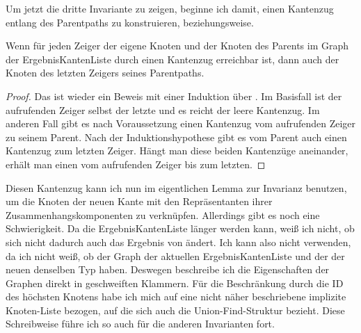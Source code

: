 


Um jetzt die dritte Invariante zu zeigen, beginne ich damit, einen Kantenzug entlang des Parentpaths zu konstruieren, beziehungsweise.

\begin{lemma}[\Kruskalparentwalk]\label{Kruskalparentwalk}
  Wenn für jeden Zeiger der eigene Knoten und der Knoten des Parents im Graph der ErgebnisKantenListe durch einen Kantenzug erreichbar ist,
  dann auch der Knoten des letzten Zeigers seines Parentpaths.
\end{lemma}
\begin{proof}
  Das ist wieder ein Beweis mit einer Induktion über \Kruskalgetparentpath.
  Im Basisfall ist der aufrufenden Zeiger selbst der letzte und es reicht der leere Kantenzug.
  Im anderen Fall gibt es nach Voraussetzung einen Kantenzug vom aufrufenden Zeiger zu seinem Parent.
  Nach der Induktionshypothese gibt es vom Parent auch einen Kantenzug zum letzten Zeiger.
  Hängt man diese beiden Kantenzüge aneinander, erhält man einen vom aufrufenden Zeiger bis zum letzten.
\end{proof}

Diesen Kantenzug kann ich nun im eigentlichen Lemma zur Invarianz benutzen, um die Knoten der neuen Kante mit den Repräsentanten ihrer Zusammenhangskomponenten zu verknüpfen.
Allerdings gibt es noch eine Schwierigkeit.
Da die ErgebnisKantenListe länger werden kann, weiß ich nicht, ob sich nicht dadurch auch das Ergebnis von \KruskalnodeListofedgeList ändert.
Ich kann also \KruskalSimpleGraphofnofedgeList nicht verwenden, da ich nicht weiß, ob der Graph der aktuellen ErgebnisKantenListe und der der neuen denselben Typ haben.
Deswegen beschreibe ich die Eigenschaften der Graphen direkt in geschweiften Klammern.
Für die Beschränkung durch die ID des höchsten Knotens habe ich mich auf eine nicht näher beschriebene implizite Knoten-Liste bezogen, auf die sich auch die Union-Find-Struktur bezieht.
Diese Schreibweise führe ich so auch für die anderen Invarianten fort.

